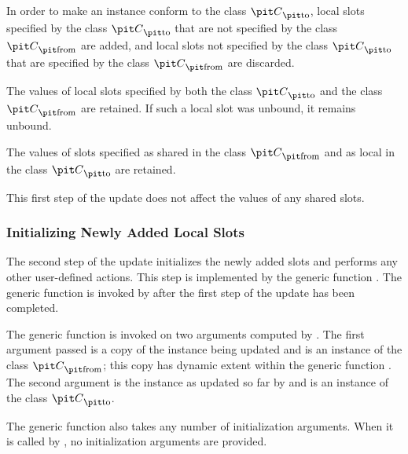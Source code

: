 In order to make an instance conform to the class ${\it C}\sub
{\hbox{{\footnotesize\it to}}}$, local slots specified by the class ${\it C}\sub
{\hbox{{\footnotesize\it to}}}$ that are not specified by the class ${\it C}\sub
{\hbox{{\footnotesize\it from}}}$ are added, and local slots not specified by
the class ${\it C}\sub {\hbox{{\footnotesize\it to}}}$ that are specified by the
class ${\it C}\sub {\hbox{{\footnotesize\it from}}}$ are discarded.

The values of local slots specified by both the class ${\it C}\sub
{\hbox{{\footnotesize\it to}}}$ and the class ${\it C}\sub {\hbox{{\footnotesize\it
from}}}$ are retained. If such a local slot was unbound, it remains
unbound.

The values of slots specified as shared in the class ${\it C}\sub
{\hbox{{\footnotesize\it from}}}$ and as local in the class ${\it C}\sub
{\hbox{{\footnotesize\it to}}}$ are retained.

This first step of the update does not affect the values of any shared
slots.


\subsubsection{Initializing Newly Added Local Slots}

The second step of the update initializes the newly added slots and
performs any other user-defined actions.  This step is implemented by
the generic function .  The
generic function  is invoked
by  after the first step of the update has been
completed.

The generic function  is
invoked on two arguments computed by .  The first
argument passed is a copy of the instance being updated and is an
instance of the class ${\it C}\sub {\hbox{{\footnotesize\it from}}}$; this copy has
dynamic extent within the generic function .  The
second argument is the instance as updated so far by 
and is an instance of the class ${\it C}\sub {\hbox{{\footnotesize\it to}}}$.

The generic function  also
takes any number of initialization arguments.  When it is called by
, no initialization arguments are provided.

